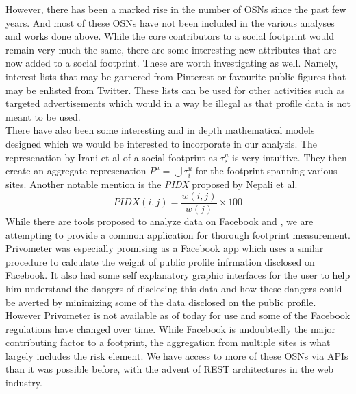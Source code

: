 \documentclass[12pt,conference]{IEEEtran}
\begin{document}
However, there has been a marked rise in the number of OSNs since the past few years. And most of these OSNs have not been included in the various analyses and works done above. While the core contributors to a social footprint would remain very much the same, there are some interesting new attributes that are now added to a social footprint. These are worth investigating as well. Namely, interest lists that may be garnered from Pinterest or favourite public figures that may be enlisted from Twitter. These lists can be used for other activities such as targeted advertisements which would in a way be illegal as that profile data is not meant to be used.\\

There have also been some interesting and in depth mathematical models designed which we would be interested to incorporate in our analysis. The represenation by Irani et al \cite{leakage} of a social footprint as \(\tau_{s}^{u}\) is very intuitive. They then create an aggregate represenation \(P^{u}=\bigcup\tau_{i}^{u}\) for the footprint spanning various sites. Another notable mention is the {\sl PIDX} proposed by Nepali et al. \cite{pidx}
\begin{equation}
PIDX(i,j) = \frac{w(i,j)}{w(j)}\times100
\end{equation}
While there are tools proposed to analyze data on Facebook \cite{privometer} and \cite{privaware}, we are attempting to provide a common application for thorough footprint measurement. Privometer was especially promising as a Facebook app which uses a smilar procedure to calculate the weight of public profile infrmation disclosed on Facebook. It also had some self explanatory graphic interfaces for the user to help him understand the dangers of disclosing this data and how these dangers could be averted by minimizing some of the data disclosed on the public profile. However Privometer is not available as of today for use and some of the Facebook regulations have changed over time. While Facebook is undoubtedly the major contributing factor to a footprint, the aggregation from multiple sites is what largely includes the risk element. We have access to more of these OSNs via APIs than it was possible before, with the advent of REST architectures in the web industry.
\end{document}
